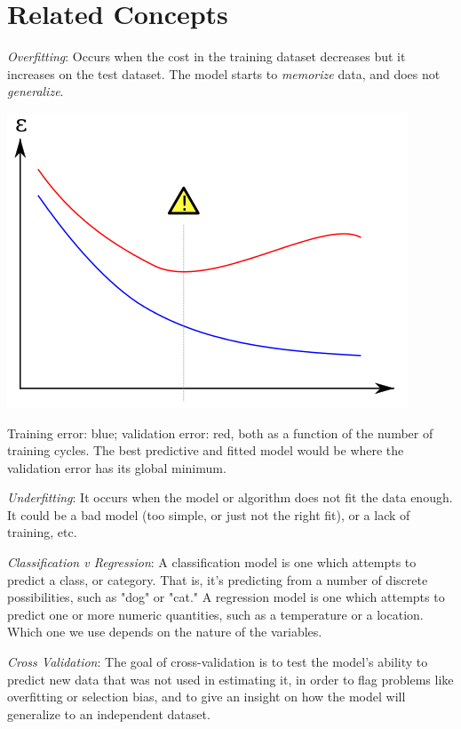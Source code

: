 \section{Related Concepts}
\textit{Overfitting}: Occurs when the cost in the training dataset decreases but it increases on the test dataset. The model starts to \textit{memorize} data, and does not \textit{generalize}.

\includegraphics[width=\textwidth]{overfitting.png}

Training error: blue; validation error: red, both as a function of the number of training cycles. The best predictive and fitted model would be where the validation error has its global minimum.

\textit{Underfitting}: It occurs when the model or algorithm does not fit the data enough. It could be a bad model (too simple, or just not the right fit), or a lack of training, etc.

\textit{Classification v Regression}: A classification model is one which attempts to predict a class, or category. That is, it's predicting from a number of discrete possibilities, such as "dog" or "cat." A regression model is one which attempts to predict one or more numeric quantities, such as a temperature or a location. Which one we use depends on the nature of the variables.

\textit{Cross Validation}: The goal of cross-validation is to test the model's ability to predict new data that was not used in estimating it, in order to flag problems like overfitting or selection bias, and to give an insight on how the model will generalize to an independent dataset.

